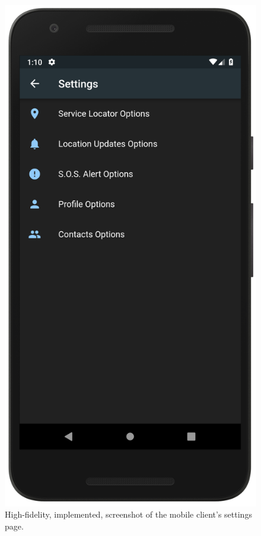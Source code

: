 \documentclass[10pt, a4paper]{article}
\begin{document}
\begin{figure}[H]
\endminipage\hfill
{}%
  \includegraphics[width=\linewidth]{demo_settings.png}
  \caption{High-fidelity, implemented, screenshot of the mobile client's settings page.}\label{fig:mobile3}
\endminipage
\end{figure}
\end{document}
